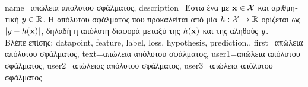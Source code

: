 {name={\foreignlanguage{greek}{απώλεια απόλυτου σφάλματος}},
	description={\foreignlanguage{greek}{Έστω ένα}  \foreignlanguage{greek}{με} 
			 ${\bf x} \in \mathcal{X}$ \foreignlanguage{greek}{και αριθμητική} 
			 $y \in \mathbb{R}$. \foreignlanguage{greek}{Η} 
			 \foreignlanguage{greek}{απόλυτου σφάλματος 
			που προκαλείται από μία}  $h: \mathcal{X} \rightarrow \mathbb{R}$ 
			\foreignlanguage{greek}{ορίζεται ως $|y - h({\bf x})|$, δηλαδή η απόλυτη διαφορά μεταξύ της} 
			 $h({\bf x})$ \foreignlanguage{greek}{και της αληθούς}  $y$.\\
			\foreignlanguage{greek}{Βλέπε επίσης:} \gls{datapoint}, \gls{feature}, \gls{label}, \gls{loss}, \gls{hypothesis}, \gls{prediction}.},
			first={\foreignlanguage{greek}{απώλεια απόλυτου σφάλματος}},
			text={\foreignlanguage{greek}{απώλεια απόλυτου σφάλματος}},
			user1={\foreignlanguage{greek}{απώλεια απόλυτου σφάλματος}}, %
			user2={\foreignlanguage{greek}{απώλειας απόλυτου σφάλματος}}, %
			user3={\foreignlanguage{greek}{απώλεια απόλυτου σφάλματος}} %
}


